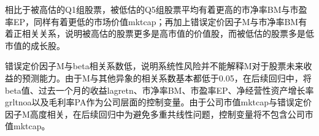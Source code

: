 相比于被高估的Q1组股票，被低估的Q5组股票平均有着更高的市净率BM与市盈率EP，同样有着更低的市场价值mktcap；再加上错误定价因子M与市净率BM有着正相关关系，说明被高估的股票更多是高市值的价值股，而被低估的股票多是低市值的成长股。

错误定价因子M与beta相关系数低，说明系统性风险并不能解释M对于股票未来收益的预测能力。由于M与其他异象的相关系数基本都低于0.05，在后续回归中，将beta值、过去一个月的收益lagretn、市净率BM、市盈率EP、净经营性资产增长率grltnoa以及毛利率PA作为公司层面的控制变量。由于公司市值mktcap与错误定价因子M高度相关，在后续回归中为避免多重共线性问题，控制变量将不包含公司市值mktcap。


%
%
%
%

